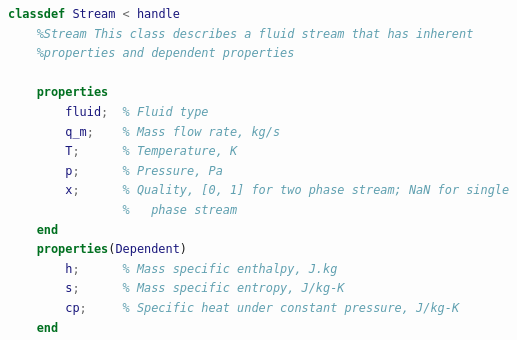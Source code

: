 \begin{lstlisting}[language= MATLAB, backgroundcolor = \color{yellow!20}, caption = {The MATLAB source code of the definition of the class -- Stream}, label = {lst:MATLAB_SOURCECODE}]
classdef Stream < handle
    %Stream This class describes a fluid stream that has inherent
    %properties and dependent properties
    
    properties
        fluid;  % Fluid type
        q_m;    % Mass flow rate, kg/s
        T;      % Temperature, K
        p;      % Pressure, Pa
        x;      % Quality, [0, 1] for two phase stream; NaN for single 
                %   phase stream
    end
    properties(Dependent)
        h;      % Mass specific enthalpy, J.kg
        s;      % Mass specific entropy, J/kg-K
        cp;     % Specific heat under constant pressure, J/kg-K
    end
    

\end{lstlisting}
